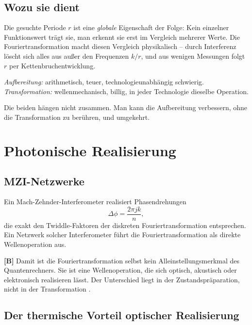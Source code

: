 \subsection{Wozu sie dient}

Die gesuchte Periode $r$ ist eine \emph{globale} Eigenschaft der Folge:
Kein einzelner Funktionswert trägt sie, man erkennt sie erst im
Vergleich mehrerer Werte. Die Fouriertransformation macht diesen
Vergleich physikalisch -- durch Interferenz löscht sich alles aus
außer den Frequenzen $k/r$, und aus wenigen Messungen folgt $r$ per
Kettenbruchentwicklung.

\begin{keyresult}
\emph{Aufbereitung:} arithmetisch, teuer, technologieunabhängig
schwierig.
\emph{Transformation:} wellenmechanisch, billig, in jeder Technologie
dieselbe Operation.

Die beiden hängen nicht zusammen. Man kann die Aufbereitung
verbessern, ohne die Transformation zu berühren, und umgekehrt.
\end{keyresult}

\section{Photonische Realisierung}
\label{sec:photonik}

\subsection{MZI-Netzwerke}

Ein Mach-Zehnder-Interferometer realisiert Phasendrehungen
\begin{equation}
  \Delta\phi = \frac{2\pi jk}{n},
\end{equation}
die exakt den Twiddle-Faktoren der diskreten Fouriertransformation
entsprechen. Ein Netzwerk solcher Interferometer führt die
Fouriertransformation als direkte Wellenoperation aus.

\textbf{[B]} Damit ist die Fouriertransformation selbst kein
Alleinstellungsmerkmal des Quantenrechners. Sie ist eine Wellenoperation, die
sich optisch, akustisch oder elektronisch realisieren lässt. Der Unterschied
liegt in der Zustandspräparation, nicht in der Transformation \cite{Nielsen2010}.

\subsection{Der thermische Vorteil optischer Realisierung}

